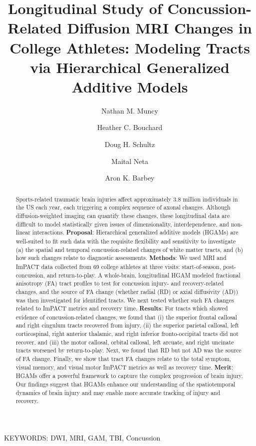 \documentclass[12pt]{article}
\title{Longitudinal Study of Concussion-Related Diffusion MRI Changes in College Athletes: Modeling Tracts via Hierarchical Generalized Additive Models}
\date{}
\author[1,2,*]{Nathan M. Muncy}
\author[1,2]{Heather C. Bouchard}
\author[1,2]{Doug H. Schultz}
\author[1,2]{Maital Neta}
\author[1,2]{Aron K. Barbey}
\affil[1]{Center for Brain, Behavior and Biology, University of Nebraska-Lincoln}
\affil[2]{Department of Psychology, University of Nebraska-Lincoln}
\affil[*]{Corresponding author.	Email: nmuncy2@unl.edu}
\begin{document}
\maketitle
\pagebreak


\begin{abstract}
Sports-related traumatic brain injuries affect approximately 3.8 million individuals in the US each year, each triggering a complex sequence of axonal changes. Although diffusion-weighted imaging can quantify these changes, these longitudinal data are difficult to model statistically given issues of dimensionality, interdependence, and non-linear interactions. \textbf{Proposal}: Hierarchical generalized additive models (HGAMs) are well-suited to fit such data with the requisite flexibility and sensitivity to investigate (a) the spatial and temporal concussion-related changes of white matter tracts, and (b) how such changes relate to diagnostic assessments. \textbf{Methods}: We used MRI and ImPACT data collected from 69 college athletes at three visits: start-of-season, post-concussion, and return-to-play. A whole-brain, longitudinal HGAM modeled fractional anisotropy (FA) tract profiles to test for concussion injury- and recovery-related changes, and the source of FA change (whether radial (RD) or axial diffusivity (AD)) was then investigated for identified tracts. We next tested whether such FA changes related to ImPACT metrics and recovery time. \textbf{Results}: For tracts which showed evidence of concussion-related changes, we found that (i) the superior frontal callosal and right cingulum tracts recovered from injury, (ii) the superior parietal callosal, left corticospinal, right anterior thalamic, and right inferior fronto-occipital tracts did not recover, and (iii) the motor callosal, orbital callosal, left arcuate, and right uncinate tracts worsened by return-to-play. Next, we found that RD but not AD was the source of FA change. Finally, we show that tract FA changes relate to the total symptom, visual memory, and visual motor ImPACT metrics as well as recovery time. \textbf{Merit}: HGAMs offer a powerful framework to capture the complex progression of brain injury. Our findings suggest that HGAMs enhance our understanding of the spatiotemporal dynamics of brain injury and may enable more accurate tracking of injury and recovery.

\end{abstract}

\vfill
KEYWORDS: DWI, MRI, GAM, TBI, Concussion\\
\pagebreak
\end{document}
